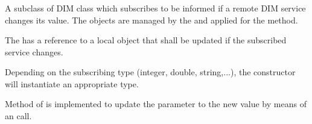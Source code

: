 \subsubsection{}
\label{prog_manager_controls_DIM_parinfo}
A subclass of DIM class  which subscribes
to be informed if a remote DIM service changes its value. 
The  objects are managed by the
 and applied for the  method.

\begin{compactenum} 

\item The  has a reference to
a local  object that shall be updated
if the subscribed service changes. 

\item Depending on the subscribing  type
(integer, double, string,...), the constructor will
instantiate an appropriate  type.

\item Method  of  
is implemented to update the parameter to the new value
by means of an  call.

\end{compactenum}

   
 
 